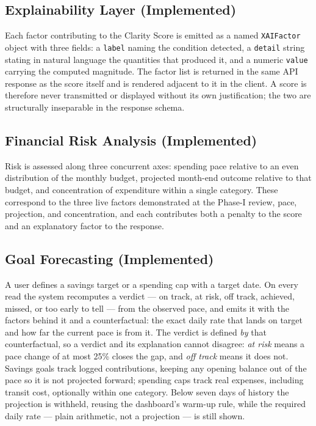 \documentclass[conference]{IEEEtran}
\begin{document}
\subsection{Explainability Layer (Implemented)}

Each factor contributing to the Clarity Score is emitted as a named \texttt{XAIFactor} object with three fields: a \texttt{label} naming the condition detected, a \texttt{detail} string stating in natural language the quantities that produced it, and a numeric \texttt{value} carrying the computed magnitude. The factor list is returned in the same API response as the score itself and is rendered adjacent to it in the client. A score is therefore never transmitted or displayed without its own justification; the two are structurally inseparable in the response schema.

\subsection{Financial Risk Analysis (Implemented)}

Risk is assessed along three concurrent axes: spending pace relative to an even distribution of the monthly budget, projected month-end outcome relative to that budget, and concentration of expenditure within a single category. These correspond to the three live factors demonstrated at the Phase-I review, pace, projection, and concentration, and each contributes both a penalty to the score and an explanatory factor to the response.

\subsection{Goal Forecasting (Implemented)}

A user defines a savings target or a spending cap with a target date. On every read the system recomputes a verdict --- on track, at risk, off track, achieved, missed, or too early to tell --- from the observed pace, and emits it with the factors behind it and a counterfactual: the exact daily rate that lands on target and how far the current pace is from it. The verdict is defined \emph{by} that counterfactual, so a verdict and its explanation cannot disagree: \emph{at risk} means a pace change of at most 25\% closes the gap, and \emph{off track} means it does not. Savings goals track logged contributions, keeping any opening balance out of the pace so it is not projected forward; spending caps track real expenses, including transit cost, optionally within one category. Below seven days of history the projection is withheld, reusing the dashboard's warm-up rule, while the required daily rate --- plain arithmetic, not a projection --- is still shown.
\end{document}
